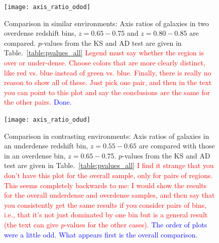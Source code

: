 \documentclass[twocolumn,useAMS,usenatbib]{mn2e}
\newcommand{\rachel}[1]{{\textcolor{red}{#1}}}
\newcommand{\arun}[1]{{\textcolor{blue}{#1}}}
\begin{document}
\begin{figure}
 \centering
 \texttt{[image: axis\_ratio\_odod]}
 \caption{Comparison in similar environments: Axis ratios of galaxies in two overdense redshift bins, $z=0.65-0.75$ and $z=0.80-0.85$ are compared. $p$-values from the KS and AD test are given in Table.~\ref{table:pvalues_all}
          \rachel{Legend must say whether the region is over or under-dense.  Choose colors that are more clearly distinct, like red vs. blue instead of green vs. blue.  Finally, there is really no reason to show all of these.  Just pick one pair, and then in the text you can point to this plot and say the conclusions are the same for the other pairs.}
          \arun{Done.}}
 \label{fig:axisratio_similar}
\end{figure}

\begin{figure}
 \centering
 \texttt{[image: axis\_ratio\_odud]}
 \caption{Comparison in contrasting environments: Axis ratios of galaxies in an underdense redshift bin, $z=0.55-0.65$ are compared with those in an overdense bin, $z=0.65-0.75$. $p$-values from the KS and AD test are given in Table.~\ref{table:pvalues_all}
          \rachel{I find it strange that you don't have this plot for the overall sample, only for pairs of regions.  This seems completely backwards to me: I would show the results for the overall underdense and overdense samples, and then say that you consistently get the same results if you consider pairs of bins, i.e., that it's not just dominated by one bin but is a general result (the text can give $p$-values for the other cases).}
          \arun{The order of plots were a little odd. What appears first is the overall comparison. }}
 \label{fig:axisratio_contrasting}
\end{figure}
\end{document}
